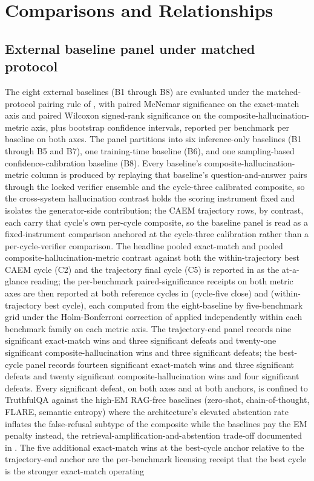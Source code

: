 \section{Comparisons and Relationships}
\label{sec:comparisons}

\subsection{External baseline panel under matched protocol}
\label{sec:comp-baselines}

The eight external baselines (B1 through B8) are evaluated under the matched-protocol pairing rule of , with paired McNemar significance on the exact-match axis and paired Wilcoxon signed-rank significance on the composite-hallucination-metric axis, plus bootstrap confidence intervals, reported per benchmark per baseline on both axes. The panel partitions into six inference-only baselines (B1 through B5 and B7), one training-time baseline (B6), and one sampling-based confidence-calibration baseline (B8). Every baseline's composite-hallucination-metric column is produced by replaying that baseline's question-and-answer pairs through the locked verifier ensemble and the cycle-three calibrated composite, so the cross-system hallucination contrast holds the scoring instrument fixed and isolates the generator-side contribution; the CAEM trajectory rows, by contrast, each carry that cycle's own per-cycle composite, so the baseline panel is read as a fixed-instrument comparison anchored at the cycle-three calibration rather than a per-cycle-verifier comparison. The headline pooled exact-match and pooled composite-hallucination-metric contrast against both the within-trajectory best CAEM cycle (C2) and the trajectory final cycle (C5) is reported in  as the at-a-glance reading; the per-benchmark paired-significance receipts on both metric axes are then reported at both reference cycles in  (cycle-five close) and  (within-trajectory best cycle), each computed from the eight-baseline by five-benchmark grid under the Holm-Bonferroni correction of  applied independently within each benchmark family on each metric axis. The trajectory-end panel records nine significant exact-match wins and three significant defeats and twenty-one significant composite-hallucination wins and three significant defeats; the best-cycle panel records fourteen significant exact-match wins and three significant defeats and twenty significant composite-hallucination wins and four significant defeats. Every significant defeat, on both axes and at both anchors, is confined to TruthfulQA against the high-EM RAG-free baselines (zero-shot, chain-of-thought, FLARE, semantic entropy) where the architecture's elevated abstention rate inflates the false-refusal subtype of the composite while the baselines pay the EM penalty instead, the retrieval-amplification-and-abstention trade-off documented in . The five additional exact-match wins at the best-cycle anchor relative to the trajectory-end anchor are the per-benchmark licensing receipt that the best cycle is the stronger exact-match operating 